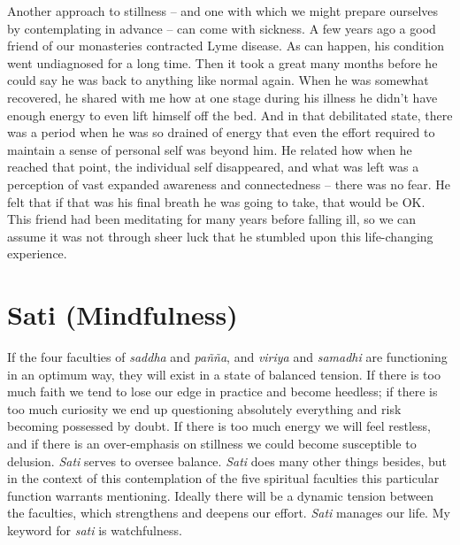 Another approach to stillness -- and one with which we might prepare
ourselves by contemplating in advance -- can come with sickness. A few
years ago a good friend of our monasteries contracted
Lyme disease\cite{lyme}. As can happen, his condition went
undiagnosed for a long time. Then it took a great many months before he
could say he was back to anything like normal again. When he was
somewhat recovered, he shared with me how at one stage during his
illness he didn't have enough energy to even lift himself off the bed.
And in that debilitated state, there was a period when he was so drained
of energy that even the effort required to maintain a sense of personal
self was beyond him. He related how when he reached that point, the
individual self disappeared, and what was left was a perception of vast
expanded awareness and connectedness -- there was no fear. He felt that
if that was his final breath he was going to take, that would be OK.
This friend had been meditating for many years before falling ill, so we
can assume it was not through sheer luck that he stumbled upon this
life-changing experience.

\section{Sati (Mindfulness)}

If the four faculties of \emph{saddha} and \emph{pañña}, and
\emph{viriya} and \emph{samadhi} are functioning in an optimum way, they
will exist in a state of balanced tension. If there is too much faith we
tend to lose our edge in practice and become heedless; if there is too
much curiosity we end up questioning absolutely everything and risk
becoming possessed by doubt. If there is too much energy we will feel
restless, and if there is an over-emphasis on stillness we could become
susceptible to delusion. \emph{Sati} serves to oversee balance.
\emph{Sati} does many other things besides, but in the context of this
contemplation of the five spiritual faculties this particular function
warrants mentioning. Ideally there will be a dynamic tension between the
faculties, which strengthens and deepens our effort. \emph{Sati} manages
our life. My keyword for \emph{sati} is watchfulness.

